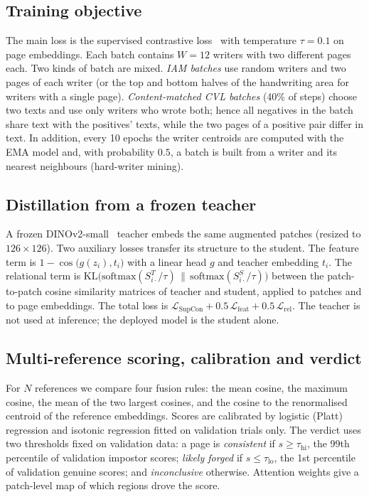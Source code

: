 \subsection{Training objective}
The main loss is the supervised contrastive loss~\cite{khosla2020supervised} with temperature $\tau=0.1$ on page embeddings.
Each batch contains $W=12$ writers with two different pages each.
Two kinds of batch are mixed.
\emph{IAM batches} use random writers and two pages of each writer (or the top and bottom halves of the handwriting area for writers with a single page).
\emph{Content-matched CVL batches} (40\% of steps) choose two texts and use only writers who wrote both; hence all negatives in the batch share text with the positives' texts, while the two pages of a positive pair differ in text.
In addition, every 10 epochs the writer centroids are computed with the EMA model and, with probability $0.5$, a batch is built from a writer and its nearest neighbours (hard-writer mining).

\subsection{Distillation from a frozen teacher}
A frozen DINOv2-small~\cite{oquab2023dinov} teacher embeds the same augmented patches (resized to $126\times126$).
Two auxiliary losses transfer its structure to the student.
The feature term is $1-\cos\big(g(z_i),t_i\big)$ with a linear head $g$ and teacher embedding $t_i$.
The relational term is $\mathrm{KL}\big(\mathrm{softmax}(S^{T}_{i\cdot}/\tau)\,\|\,\mathrm{softmax}(S^{S}_{i\cdot}/\tau)\big)$ between the patch-to-patch cosine similarity matrices of teacher and student, applied to patches and to page embeddings.
The total loss is $\mathcal{L}_{\mathrm{SupCon}}+0.5\,\mathcal{L}_{\mathrm{feat}}+0.5\,\mathcal{L}_{\mathrm{rel}}$.
The teacher is not used at inference; the deployed model is the student alone.

\subsection{Multi-reference scoring, calibration and verdict}
For $N$ references we compare four fusion rules: the mean cosine, the maximum cosine, the mean of the two largest cosines, and the cosine to the renormalised centroid of the reference embeddings.
Scores are calibrated by logistic (Platt) regression and isotonic regression fitted on validation trials only.
The verdict uses two thresholds fixed on validation data: a page is \emph{consistent} if $s\ge\tau_{\mathrm{hi}}$, the 99th percentile of validation impostor scores; \emph{likely forged} if $s\le\tau_{\mathrm{lo}}$, the 1st percentile of validation genuine scores; and \emph{inconclusive} otherwise.
Attention weights give a patch-level map of which regions drove the score.
